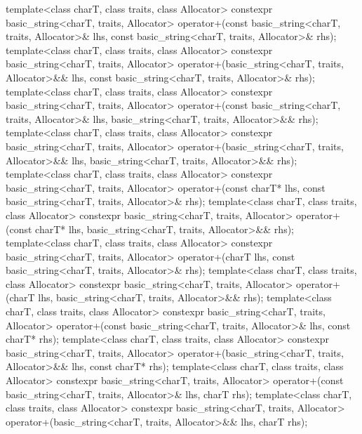 \begin{codeblock}
{  template<class charT, class traits, class Allocator>
    constexpr basic_string<charT, traits, Allocator>
      operator+(const basic_string<charT, traits, Allocator>& lhs,
                const basic_string<charT, traits, Allocator>& rhs);
  template<class charT, class traits, class Allocator>
    constexpr basic_string<charT, traits, Allocator>
      operator+(basic_string<charT, traits, Allocator>&& lhs,
                const basic_string<charT, traits, Allocator>& rhs);
  template<class charT, class traits, class Allocator>
    constexpr basic_string<charT, traits, Allocator>
      operator+(const basic_string<charT, traits, Allocator>& lhs,
                basic_string<charT, traits, Allocator>&& rhs);
  template<class charT, class traits, class Allocator>
    constexpr basic_string<charT, traits, Allocator>
      operator+(basic_string<charT, traits, Allocator>&& lhs,
                basic_string<charT, traits, Allocator>&& rhs);
  template<class charT, class traits, class Allocator>
    constexpr basic_string<charT, traits, Allocator>
      operator+(const charT* lhs,
                const basic_string<charT, traits, Allocator>& rhs);
  template<class charT, class traits, class Allocator>
    constexpr basic_string<charT, traits, Allocator>
      operator+(const charT* lhs,
                basic_string<charT, traits, Allocator>&& rhs);
  template<class charT, class traits, class Allocator>
    constexpr basic_string<charT, traits, Allocator>
      operator+(charT lhs,
                const basic_string<charT, traits, Allocator>& rhs);
  template<class charT, class traits, class Allocator>
    constexpr basic_string<charT, traits, Allocator>
      operator+(charT lhs,
                basic_string<charT, traits, Allocator>&& rhs);
  template<class charT, class traits, class Allocator>
    constexpr basic_string<charT, traits, Allocator>
      operator+(const basic_string<charT, traits, Allocator>& lhs,
                const charT* rhs);
  template<class charT, class traits, class Allocator>
    constexpr basic_string<charT, traits, Allocator>
      operator+(basic_string<charT, traits, Allocator>&& lhs,
                const charT* rhs);
  template<class charT, class traits, class Allocator>
    constexpr basic_string<charT, traits, Allocator>
      operator+(const basic_string<charT, traits, Allocator>& lhs,
                charT rhs);
  template<class charT, class traits, class Allocator>
    constexpr basic_string<charT, traits, Allocator>
      operator+(basic_string<charT, traits, Allocator>&& lhs,
                charT rhs);

}
\end{codeblock}

